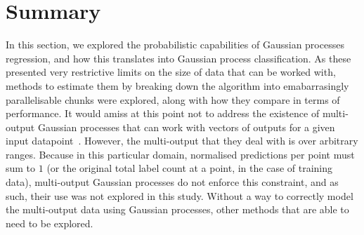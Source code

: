 \section{Summary}

In this section, we explored the probabilistic capabilities of Gaussian processes regression, and how this translates into Gaussian process classification. As these presented very restrictive limits on the size of data that can be worked with, methods to estimate them by breaking down the algorithm into emabarrasingly parallelisable chunks were explored, along with how they compare in terms of performance. It would amiss at this point not to address the existence of multi-output Gaussian processes that can work with vectors of outputs for a given input datapoint~\citep{alvarez09}. However, the multi-output that they deal with is over arbitrary ranges. Because in this particular domain, normalised predictions per point must sum to $1$ (or the original total label count at a point, in the case of training data), multi-output Gaussian processes do not enforce this constraint, and as such, their use was not explored in this study. Without a way to correctly model the multi-output data using Gaussian processes, other methods that are able to need to be explored.


